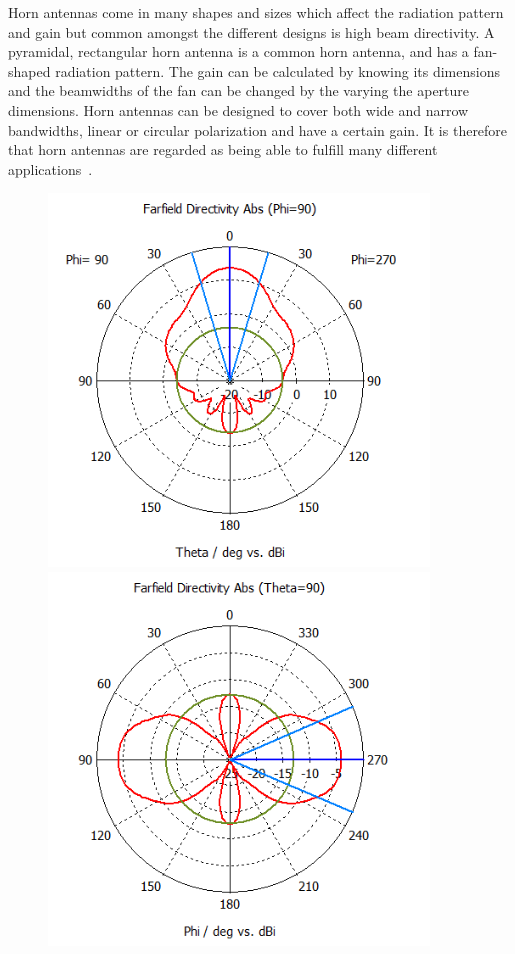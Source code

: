 Horn antennas come in many shapes and sizes which affect the radiation pattern and gain but common amongst the different designs is high beam directivity. A pyramidal, rectangular horn antenna is a common horn antenna, and has a fan-shaped radiation pattern. The gain can be calculated by knowing its dimensions and the beamwidths of the fan can be changed by the varying the aperture dimensions. Horn antennas can be designed to cover both wide and narrow bandwidths, linear or circular polarization and have a certain gain. It is therefore that horn antennas are regarded as being able to fulfill many different applications~\cite[p. 14.1-14.3]{ant_eng_hk}.  
\begin{figure}[H]
    \begin{minipage}{0.45\textwidth}
        \centering
        \includegraphics[width=0.9\textwidth]{figures/farfield (f=2.4) horn.png} %
    \end{minipage}\hfill
    \begin{minipage}{0.45\textwidth}
        \centering
        \includegraphics[width=0.9\textwidth]{figures/farfield (f=2.4) horn_1.png} %

\end{minipage}
\end{figure}
